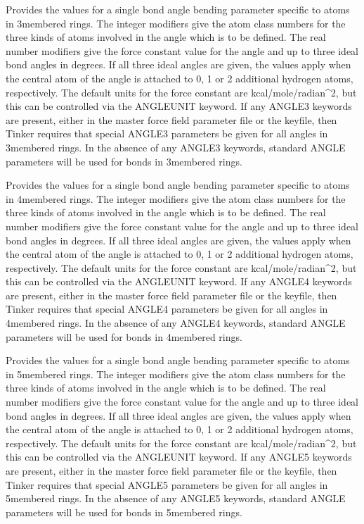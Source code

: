 \documentclass[letterpaper,11pt,english]{sphinxmanual}
\begin{document}
  Provides the values for a single bond angle bending parameter specific to atoms in 3\sphinxhyphen{}membered rings. The integer modifiers give the atom class numbers for the three kinds of atoms involved in the angle which is to be defined. The real number modifiers give the force constant value for the angle and up to three ideal bond angles in degrees. If all three ideal angles are given, the values apply when the central atom of the angle is attached to 0, 1 or 2 additional hydrogen atoms, respectively. The default units for the force constant are kcal/mole/radian\textasciicircum{}2, but this can be controlled via the ANGLEUNIT keyword. If any ANGLE3 keywords are present, either in the master force field parameter file or the keyfile, then Tinker requires that special ANGLE3 parameters be given for all angles in 3\sphinxhyphen{}membered rings. In the absence of any ANGLE3 keywords, standard ANGLE parameters will be used for bonds in 3\sphinxhyphen{}membered rings.

  Provides the values for a single bond angle bending parameter specific to atoms in 4\sphinxhyphen{}membered rings. The integer modifiers give the atom class numbers for the three kinds of atoms involved in the angle which is to be defined. The real number modifiers give the force constant value for the angle and up to three ideal bond angles in degrees. If all three ideal angles are given, the values apply when the central atom of the angle is attached to 0, 1 or 2 additional hydrogen atoms, respectively. The default units for the force constant are kcal/mole/radian\textasciicircum{}2, but this can be controlled via the ANGLEUNIT keyword. If any ANGLE4 keywords are present, either in the master force field parameter file or the keyfile, then Tinker requires that special ANGLE4 parameters be given for all angles in 4\sphinxhyphen{}membered rings. In the absence of any ANGLE4 keywords, standard ANGLE parameters will be used for bonds in 4\sphinxhyphen{}membered rings.

  Provides the values for a single bond angle bending parameter specific to atoms in 5\sphinxhyphen{}membered rings. The integer modifiers give the atom class numbers for the three kinds of atoms involved in the angle which is to be defined. The real number modifiers give the force constant value for the angle and up to three ideal bond angles in degrees. If all three ideal angles are given, the values apply when the central atom of the angle is attached to 0, 1 or 2 additional hydrogen atoms, respectively. The default units for the force constant are kcal/mole/radian\textasciicircum{}2, but this can be controlled via the ANGLEUNIT keyword. If any ANGLE5 keywords are present, either in the master force field parameter file or the keyfile, then Tinker requires that special ANGLE5 parameters be given for all angles in 5\sphinxhyphen{}membered rings. In the absence of any ANGLE5 keywords, standard ANGLE parameters will be used for bonds in 5\sphinxhyphen{}membered rings.
\end{document}
